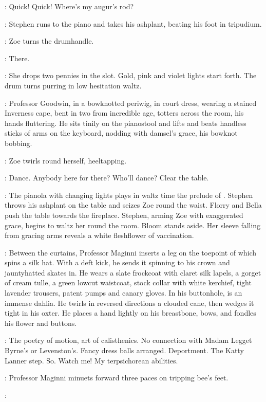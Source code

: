 \Stephen:
Quick!
Quick!
Where's my augur's rod?

:
Stephen runs to the piano and takes his ashplant,
beating his foot in tripudium.

:
Zoe turns the drumhandle.

\Zoe:
There.

:
She drops two pennies in the slot.
Gold, pink and violet lights start forth.
The drum turns purring in low hesitation waltz.

:
Professor Goodwin, in a bowknotted periwig, in court dress,
wearing a stained Inverness cape, bent in two from incredible age,
totters across the room, his hands fluttering.
He sits tinily on the pianostool and lifts
and beats handless sticks of arms on the keyboard,
nodding with damsel's grace, his bowknot bobbing.

:
Zoe twirls round herself, heeltapping.

\Zoe:
Dance.
Anybody here for there?
Who'll dance?
Clear the table.

:
The pianola with changing lights plays in waltz time
the prelude of .
Stephen throws his ashplant on the table and seizes Zoe round the waist.
Florry and Bella push the table towards the fireplace.
Stephen, arming Zoe with exaggerated grace, begins to waltz her round the room.
Bloom stands aside.
Her sleeve falling from gracing arms reveals a white fleshflower of vaccination.

:
Between the curtains, Professor Maginni inserts a leg
on the toepoint of which spins a silk hat.
With a deft kick, he sends it spinning to his crown and jauntyhatted skates in.
He wears a slate frockcoat with claret silk lapels,
a gorget of cream tulle, a green lowcut waistcoat, stock collar with white kerchief, 
tight lavender trousers, patent pumps and canary gloves.
In his buttonhole, is an immense dahlia.
He twirls in reversed directions a clouded cane, then wedges it tight in his oxter.
He places a hand lightly on his breastbone,
bows, and fondles his flower and buttons.

\Maginni[2]:
The poetry of motion, art of calisthenics.
No connection with Madam Legget Byrne's or Levenston's.
Fancy dress balls arranged.
Deportment.
The Katty Lanner step.
So. Watch me!
My terpsichorean abilities.

:
Professor Maginni minuets forward three paces on tripping bee's feet.

\Maginni:

